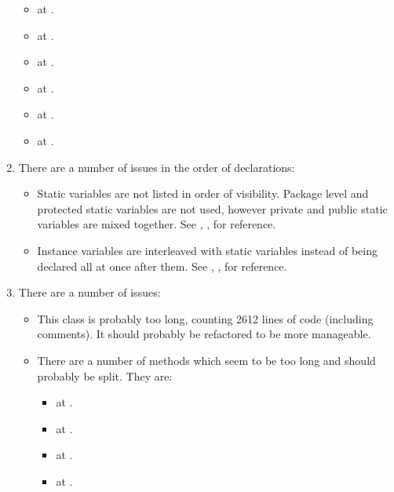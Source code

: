 \begin{enumerate}
\begin{itemize}
		\item {} at .
		\item {} at .
		\item {} at .
		\item {} at .
		\item {} at .
		\item {} at .
		\end{itemize}
	\item {} There are a number of issues in the order of declarations:
		\begin{itemize}
			\item Static variables are not listed in order of visibility. Package level and protected static variables are not used, however private and public static variables are mixed together. See , ,  for reference.
			\item Instance variables are interleaved with static variables instead of being declared all at once after them. See , ,  for reference. 
		\end{itemize}
	\item {} There are a number of issues:
		\begin{itemize}
			\item This class is probably too long, counting 2612 lines of code (including comments). It should probably be refactored to be more manageable. 
			\item There are a number of methods which seem to be too long and should probably be split. They are:
				\begin{itemize}
				\item {} at .
				\item {} at .
				\item {} at .
				\item {} at .

\end{itemize}
\end{itemize}
\end{enumerate}
